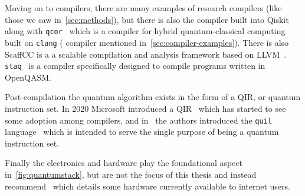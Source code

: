 Moving on to compilers, there are many examples of research compilers (like those we saw in~\cref{sec:methods}), but there is also the compiler built into Qiskit along with \texttt{qcor}~\cite{qcor} which is a \CPP{} compiler for hybrid quantum-classical computing built on \texttt{clang} (\CPP{} compiler mentioned in~\cref{sec:compiler-examples}).
There is also ScaffCC is a a scalable compilation and analysis framework based on LLVM~\cite{scaffcc,scaffcc2}.
\texttt{staq}~\cite{staq} is a compiler specifically designed to compile programs written in OpenQASM.\@

Post-compilation the quantum algorithm exists in the form of a \ac{QIR}, or quantum instruction set.
In 2020 Microsoft introduced a \ac{QIR}~\cite{qir} which has started to see some adoption among compilers, and in~\cite{qisa} the authors introduced the \texttt{quil} language~\cite{quil} which is intended to serve the single purpose of being a quantum instruction set.

Finally the electronics and hardware play the foundational aspect in~\cref{fig:quantumstack}, but are not the focus of this thesis and instead recommend~\cite{qlangcomparision} which details some hardware currently available to internet users.
